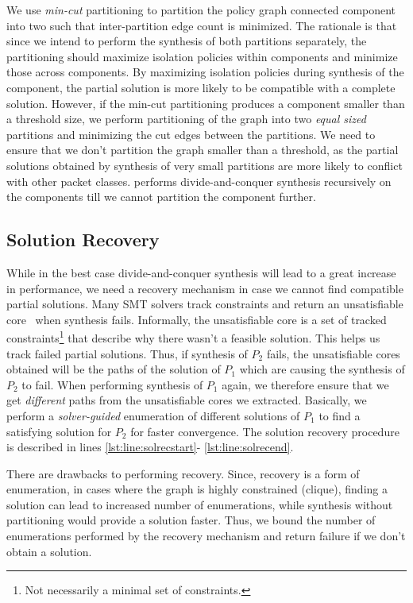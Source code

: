 We use \emph{min-cut} partitioning to partition the policy graph
connected component into two such that inter-partition edge count is
minimized. The rationale  is that since we intend
to perform the synthesis of both partitions separately, the partitioning
should maximize  isolation policies within components and minimize those
across components. By maximizing isolation policies during synthesis
of the component, the partial solution is more likely to be compatible
with a complete solution. However, if the min-cut partitioning
produces a component smaller than a threshold size, we perform
partitioning of the graph into two \emph{equal sized} partitions and
minimizing the cut edges between the partitions. We need to ensure
that we don't partition the graph smaller than a threshold, as the
partial solutions obtained by synthesis of very small partitions are
more likely to conflict with other packet classes. \Name 
performs divide-and-conquer synthesis recursively on the
components till we cannot partition the component further.

\subsection{Solution Recovery} \label{sec:recovery}
While in the best case divide-and-conquer synthesis  will lead to a great
increase in performance, we need a recovery mechanism in case we cannot find
compatible partial solutions. Many SMT solvers track constraints and return
an unsatisfiable core~\cite{unsatcores} when synthesis fails. Informally,
the unsatisfiable
core is a set of tracked constraints\footnote{
	Not necessarily a minimal set of constraints.}
 that describe why there wasn't a feasible 
solution. This helps us track failed partial solutions. 
Thus, if synthesis of $P_2$ fails, the unsatisfiable cores
obtained will be the paths of the solution of $P_1$ which are
causing the synthesis of $P_2$ to fail. 
When performing synthesis of $P_1$
again, we therefore ensure that we get \emph{different} paths from the
unsatisfiable cores we extracted.  Basically, we perform a 
\emph{solver-guided} enumeration of different solutions of $P_1$ to
find a satisfying solution for $P_2$ for faster convergence. 
The solution recovery procedure is described in lines \ref{lst:line:solrecstart}-
\ref{lst:line:solrecend}.

There are drawbacks to performing recovery. Since, recovery is a 
form of enumeration, in cases where the graph is highly constrained
(clique), finding a solution can lead to increased number of enumerations,
while synthesis without partitioning would provide a solution faster. 
Thus, we bound the number of enumerations performed by the 
recovery mechanism and return failure
if we don't obtain a solution. 

